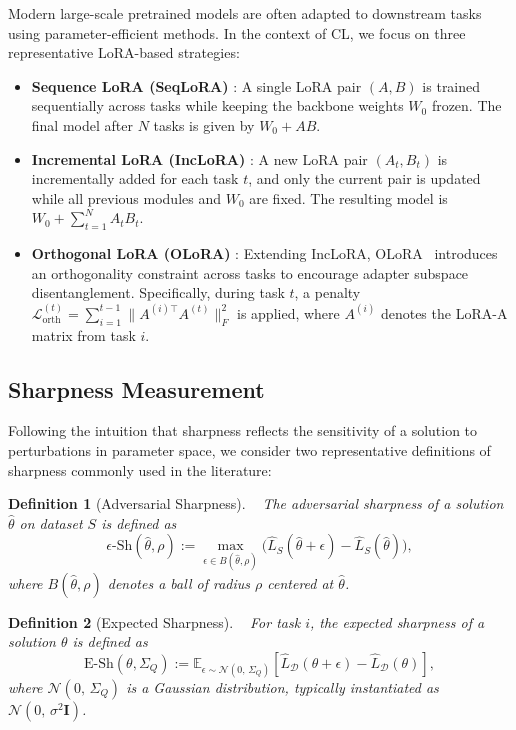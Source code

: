 \documentclass[letterpaper]{article} %
\newtheorem{definition}{Definition}
\begin{document}
Modern large-scale pretrained models are often adapted to downstream tasks using parameter-efficient methods. In the context of CL, we focus on three representative LoRA-based strategies:
\begin{itemize}
 \item \textbf{Sequence LoRA (SeqLoRA)} : A single LoRA pair $(A, B)$ is trained sequentially across tasks while keeping the backbone weights $W_0$ frozen. The final model after $N$ tasks is given by $W_0 + AB$.
\item \textbf{Incremental LoRA (IncLoRA)} : A new LoRA pair $(A_t, B_t)$ is incrementally added for each task $t$, and only the current pair is updated while all previous modules and $W_0$ are fixed. The resulting model is $W_0 + \sum_{t=1}^N A_t B_t$.
\item \textbf{Orthogonal LoRA (OLoRA)} : Extending IncLoRA, OLoRA~\cite{wang2023orthogonal} introduces an orthogonality constraint across tasks to encourage adapter subspace disentanglement. Specifically, during task $t$, a penalty $\mathcal{L}_{\text{orth}}^{(t)} = \sum_{i=1}^{t-1} \|A^{(i)\top} A^{(t)}\|_F^2$ is applied, where $A^{(i)}$ denotes the LoRA-A matrix from task $i$.
\end{itemize}


\subsection{Sharpness Measurement}

Following the intuition that sharpness reflects the sensitivity of a solution to perturbations in parameter space, we consider two representative definitions of sharpness commonly used in the literature:


\begin{definition}[Adversarial Sharpness]~\cite{foretSharpnessAwareMinimizationEfficiently2021}
The adversarial sharpness of a solution $\hat{\theta}$ on dataset $S$ is defined as
\begin{equation}
    \epsilon\text{-Sh}(\hat{\theta}, \rho) :=\max_{\epsilon \in B(\hat\theta, \rho)} \big( \hat{L}_{S}(\hat{\theta} + \epsilon) - \hat{L}_{S}(\hat{\theta}) \big),
\end{equation}
where $B(\hat\theta, \rho)$ denotes a ball of radius $\rho$ centered at $\hat\theta$.
\end{definition}


\begin{definition}[Expected Sharpness]~\cite{liRevisitingRandomWeight2024}
For task $i$, the expected sharpness of a solution $\theta$ is defined as
\begin{equation}\label{def: Task-Aware Expected Sharpness}
    \text{E-Sh}(\theta, \Sigma_Q) := \mathbb{E}_{\epsilon \sim \mathcal{N}(0,\,\Sigma_Q)} \left[ \hat{L}_{\mathcal{D}}(\theta + \epsilon) - \hat{L}_{\mathcal{D}}(\theta) \right],
\end{equation}
where $\mathcal{N}(0,\,\Sigma_Q)$ is a Gaussian distribution, typically instantiated as $\mathcal{N}(0,\, \sigma^2 \mathbf{I})$.
\end{definition}
\end{document}
